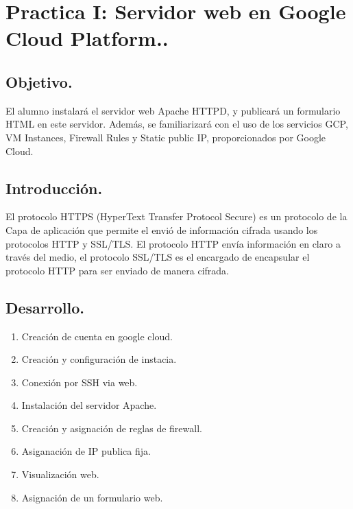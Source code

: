 \documentclass[12pt]{article}
\begin{document}

{\color{red} \section*{\textbf{Practica I: Servidor web en Google Cloud Platform..}}}
\vspace{1em}

{\color{blue} \subsection*{\textbf{Objetivo.}}}
\vspace{1em}
El alumno instalará el servidor web Apache HTTPD, y publicará un formulario HTML en este servidor. Además, se familiarizará con el uso de los servicios GCP, VM Instances, Firewall Rules y Static public IP, proporcionados por Google Cloud.
\vspace{2em}

{\color{blue} \subsection*{\textbf{Introducción.}}}
\vspace{1em}
El protocolo HTTPS (HyperText Transfer Protocol Secure) es un protocolo de la Capa de aplicación que permite el envió de información cifrada usando los protocolos HTTP y SSL/TLS. El protocolo HTTP envía información en claro a través del medio, el protocolo SSL/TLS es el encargado de encapsular el protocolo HTTP para ser enviado de manera cifrada.
\vspace{2em}


{\color{blue} \subsection*{\textbf{Desarrollo.}}}
\vspace{1em}
\begin{enumerate}
    \item Creación de cuenta en google cloud.
    \item Creación y configuración de instacia.
    \item Conexión por SSH via web.
    \item Instalación del servidor Apache.
    \item Creación y asignación de reglas de firewall.
    \item Asiganación de IP publica fija.
    \item Visualización web.
    \item Asignación de un formulario web.
\end{enumerate}
\vspace{2em}
\end{document}
